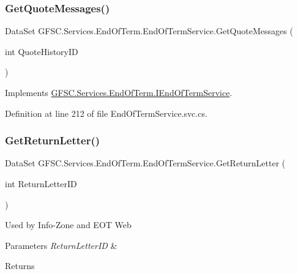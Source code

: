\subsubsection{\texorpdfstring{Get\+Quote\+Messages()}{GetQuoteMessages()}}
{\footnotesize\ttfamily Data\+Set G\+F\+S\+C.\+Services.\+End\+Of\+Term.\+End\+Of\+Term\+Service.\+Get\+Quote\+Messages (\begin{DoxyParamCaption}\item[{int}]{Quote\+History\+ID }\end{DoxyParamCaption})}



Implements \mbox{\hyperlink{interface_g_f_s_c_1_1_services_1_1_end_of_term_1_1_i_end_of_term_service_a8e86e5647676ef7bb7f58295d52bc322}{G\+F\+S\+C.\+Services.\+End\+Of\+Term.\+I\+End\+Of\+Term\+Service}}.



Definition at line 212 of file End\+Of\+Term\+Service.\+svc.\+cs.

\mbox{\label{class_g_f_s_c_1_1_services_1_1_end_of_term_1_1_end_of_term_service_a8b73d602cbe6591822f1bdffb30f0860}} 
\subsubsection{\texorpdfstring{Get\+Return\+Letter()}{GetReturnLetter()}}
{\footnotesize\ttfamily Data\+Set G\+F\+S\+C.\+Services.\+End\+Of\+Term.\+End\+Of\+Term\+Service.\+Get\+Return\+Letter (\begin{DoxyParamCaption}\item[{int}]{Return\+Letter\+ID }\end{DoxyParamCaption})}



Used by Info-\/\+Zone and E\+OT Web 


\begin{DoxyParams}{Parameters}
{\em Return\+Letter\+ID} & \\
\hline
\end{DoxyParams}
\begin{DoxyReturn}{Returns}

\end{DoxyReturn}


